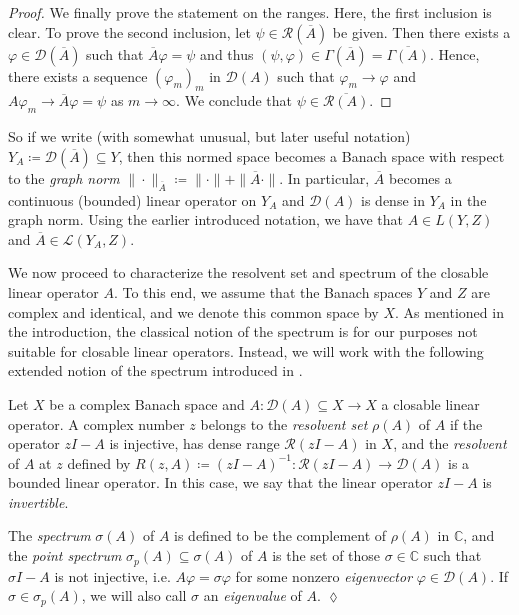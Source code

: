 \documentclass[english]{myarticle}
\begin{document}
\begin{sloppypar}
\begin{proof}
We finally prove the statement on the ranges. Here, the first inclusion is clear. To prove the second inclusion, let $\psi \in \mathcal{R}(\overline{A})$ be given. Then there exists a $\varphi \in \mathcal{D}(\overline{A})$ such that $\overline{A}\varphi = \psi$ and thus $(\psi,\varphi) \in \Gamma(\overline{A}) = \overline{\Gamma(A)}$. Hence, there exists a sequence $(\varphi_m)_m$ in $\mathcal{D}(A)$ such that $\varphi_m \to \varphi$ and $A\varphi_m \to \overline{A}\varphi = \psi$ as $m \to \infty$. We conclude that $\psi \in \overline{\mathcal{R}(A)}$.  
\end{proof}
So if we write (with somewhat unusual, but later useful notation) $Y_A \coloneqq \mathcal{D}(\overline{A}) \subseteq Y$, then this normed space becomes a Banach space with respect to the \emph{graph norm} $\| \cdot \|_{\overline{A}} \coloneqq \| \cdot \| + \|\overline{A} \cdot \|$. In particular, $\overline{A}$ becomes a continuous (bounded) linear operator on $Y_A$ and $\mathcal{D}(A)$ is dense in $Y_A$ in the graph norm. Using the earlier introduced notation, we have that $A \in L(Y,Z)$ and $\overline{A} \in \mathcal{L}(Y_A,Z)$.

We now proceed to characterize the resolvent set and spectrum of the closable linear operator $A$. To this end, we assume that the Banach spaces $Y$ and $Z$ are complex and identical, and we denote this common space by $X$. As mentioned in the introduction, the classical notion of the spectrum is for our purposes not suitable for closable linear operators. Instead, we will work with the following extended notion of the spectrum introduced in \cite[Chapter 5]{Taylor1986}.

\begin{definition} \label{def:resolvent}
Let $X$ be a complex Banach space and $A : \mathcal{D}(A) \subseteq X \to X$ a closable linear operator. A complex number $z$ belongs to the \emph{resolvent set} $\rho(A)$ of $A$ if the operator $zI - A$ is injective, has dense range $\mathcal{R}(zI-A)$ in $X$, and the \emph{resolvent} of $A$ at $z$ 
defined by $R(z,A) \coloneqq (zI-A)^{-1}: \mathcal{R}(zI-A) \to \mathcal{D}(A)$ is a bounded linear operator. In this case, we say that the linear operator $zI - A$ is \emph{invertible}.

The \emph{spectrum} $\sigma(A)$ of $A$ is defined to be the complement of $\rho(A)$ in $\mathbb{C}$, and the \emph{point spectrum} $\sigma_p(A) \subseteq \sigma(A)$ of $A$ is the set of those $\sigma \in \mathbb{C}$ such that $\sigma I - A$ is not injective, i.e. $A \varphi = \sigma \varphi$ for some nonzero \emph{eigenvector} $\varphi \in \mathcal{D}(A)$. If $\sigma \in \sigma_p(A)$, we will also call $\sigma$ an \emph{eigenvalue} of $A$. \hfill $\lozenge$
\end{definition}


\end{sloppypar}
\end{document}
